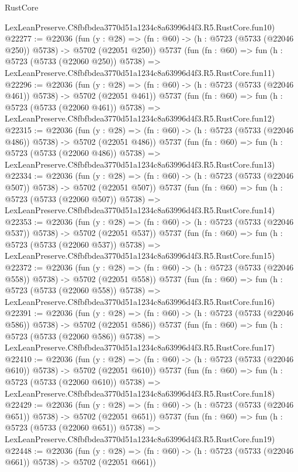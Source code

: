 \begin{lexlean}{RustCore}
\begin{coremodule}
    LexLeanPreserve.C8fbfbdea3770d51a1234c8a63996d4f3.R5.RustCore.fun10)
@22277 := @22036
    (fun (y : @28) => (fn : @60) -> (h : @5723 (@5733 (@22046 @250)) @5738) -> @5702 (@22051 @250))
    @5737
    (fun (fn : @60) =>
    fun (h : @5723 (@5733 (@22060 @250)) @5738) =>
    LexLeanPreserve.C8fbfbdea3770d51a1234c8a63996d4f3.R5.RustCore.fun11)
@22296 := @22036
    (fun (y : @28) => (fn : @60) -> (h : @5723 (@5733 (@22046 @461)) @5738) -> @5702 (@22051 @461))
    @5737
    (fun (fn : @60) =>
    fun (h : @5723 (@5733 (@22060 @461)) @5738) =>
    LexLeanPreserve.C8fbfbdea3770d51a1234c8a63996d4f3.R5.RustCore.fun12)
@22315 := @22036
    (fun (y : @28) => (fn : @60) -> (h : @5723 (@5733 (@22046 @486)) @5738) -> @5702 (@22051 @486))
    @5737
    (fun (fn : @60) =>
    fun (h : @5723 (@5733 (@22060 @486)) @5738) =>
    LexLeanPreserve.C8fbfbdea3770d51a1234c8a63996d4f3.R5.RustCore.fun13)
@22334 := @22036
    (fun (y : @28) => (fn : @60) -> (h : @5723 (@5733 (@22046 @507)) @5738) -> @5702 (@22051 @507))
    @5737
    (fun (fn : @60) =>
    fun (h : @5723 (@5733 (@22060 @507)) @5738) =>
    LexLeanPreserve.C8fbfbdea3770d51a1234c8a63996d4f3.R5.RustCore.fun14)
@22353 := @22036
    (fun (y : @28) => (fn : @60) -> (h : @5723 (@5733 (@22046 @537)) @5738) -> @5702 (@22051 @537))
    @5737
    (fun (fn : @60) =>
    fun (h : @5723 (@5733 (@22060 @537)) @5738) =>
    LexLeanPreserve.C8fbfbdea3770d51a1234c8a63996d4f3.R5.RustCore.fun15)
@22372 := @22036
    (fun (y : @28) => (fn : @60) -> (h : @5723 (@5733 (@22046 @558)) @5738) -> @5702 (@22051 @558))
    @5737
    (fun (fn : @60) =>
    fun (h : @5723 (@5733 (@22060 @558)) @5738) =>
    LexLeanPreserve.C8fbfbdea3770d51a1234c8a63996d4f3.R5.RustCore.fun16)
@22391 := @22036
    (fun (y : @28) => (fn : @60) -> (h : @5723 (@5733 (@22046 @586)) @5738) -> @5702 (@22051 @586))
    @5737
    (fun (fn : @60) =>
    fun (h : @5723 (@5733 (@22060 @586)) @5738) =>
    LexLeanPreserve.C8fbfbdea3770d51a1234c8a63996d4f3.R5.RustCore.fun17)
@22410 := @22036
    (fun (y : @28) => (fn : @60) -> (h : @5723 (@5733 (@22046 @610)) @5738) -> @5702 (@22051 @610))
    @5737
    (fun (fn : @60) =>
    fun (h : @5723 (@5733 (@22060 @610)) @5738) =>
    LexLeanPreserve.C8fbfbdea3770d51a1234c8a63996d4f3.R5.RustCore.fun18)
@22429 := @22036
    (fun (y : @28) => (fn : @60) -> (h : @5723 (@5733 (@22046 @651)) @5738) -> @5702 (@22051 @651))
    @5737
    (fun (fn : @60) =>
    fun (h : @5723 (@5733 (@22060 @651)) @5738) =>
    LexLeanPreserve.C8fbfbdea3770d51a1234c8a63996d4f3.R5.RustCore.fun19)
@22448 := @22036
    (fun (y : @28) => (fn : @60) -> (h : @5723 (@5733 (@22046 @661)) @5738) -> @5702 (@22051 @661))

\end{coremodule}
\end{lexlean}
